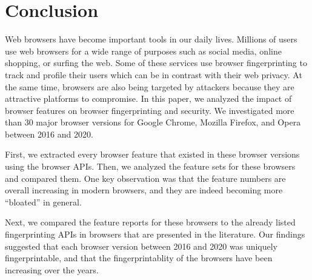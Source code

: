 \section{Conclusion}
\label{sec:conclusion}

Web browsers have become important tools in our daily lives.
Millions of users use web browsers for a wide range of purposes such
as social media, online shopping, or surfing the web. Some of these
services use browser fingerprinting to track and profile their users
which can be in contrast with their web privacy. At the same time,
browsers are also being targeted by attackers because they are
attractive platforms to compromise. In this paper, we analyzed the
impact of browser features on browser fingerprinting and security. We
investigated more than 30 major browser versions for Google
Chrome, Mozilla Firefox, and Opera between 2016 and 2020.

First, we extracted every browser feature that existed in these
browser versions using the browser APIs. Then, we analyzed the feature
sets for these browsers and compared them. One key observation was
that the feature numbers are overall increasing in modern browsers,
and they are indeed becoming more ``bloated'' in general.

Next, we compared the feature reports for these browsers to the
already listed fingerprinting APIs in browsers that are presented in the
literature. Our findings suggested that each browser version between 2016
and 2020 was uniquely fingerprintable, and that the fingerprintablity
of the browsers have been increasing over the years.

